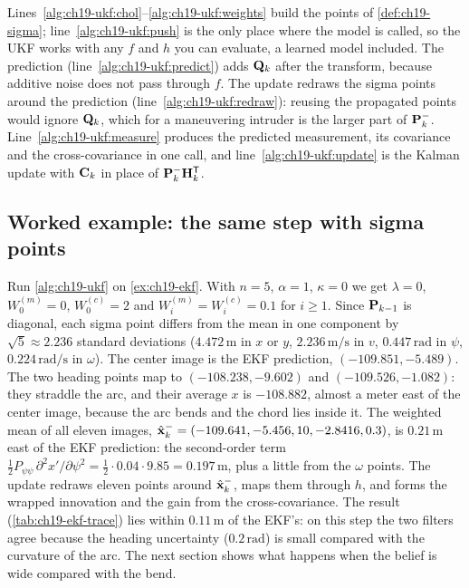 Lines~\ref{alg:ch19-ukf:chol}--\ref{alg:ch19-ukf:weights} build the points
of \cref{def:ch19-sigma}; line~\ref{alg:ch19-ukf:push} is the only place
where the model is called, so the UKF works with any $f$ and $h$ you can
evaluate, a learned model included. The prediction
(line~\ref{alg:ch19-ukf:predict}) adds $\mathbf{Q}_k$ after the transform,
because additive noise does not pass through $f$. The update redraws the
sigma points around the prediction (line~\ref{alg:ch19-ukf:redraw}):
reusing the propagated points would ignore $\mathbf{Q}_k$, which for a
maneuvering intruder is the larger part of $\mathbf{P}_k^-$.
Line~\ref{alg:ch19-ukf:measure} produces the predicted measurement, its
covariance and the cross-covariance in one call, and
line~\ref{alg:ch19-ukf:update} is the Kalman update with $\mathbf{C}_k$ in place
of $\mathbf{P}_k^-\mathbf{H}_k^{\mathsf{T}}$.

\subsection{Worked example: the same step with sigma points}
\label{sec:ch19-ukf-example}

Run \cref{alg:ch19-ukf} on \cref{ex:ch19-ekf}. With $n = 5$, $\alpha = 1$,
$\kappa = 0$ we get $\lambda = 0$, $W_0^{(m)} = 0$, $W_0^{(c)} = 2$ and
$W_i^{(m)} = W_i^{(c)} = 0.1$ for $i \ge 1$. Since $\mathbf{P}_{k-1}$ is
diagonal, each sigma point differs from the mean in one component by
$\sqrt{5} \approx 2.236$ standard deviations ($4.472\,\mathrm{m}$ in $x$ or
$y$, $2.236\,\mathrm{m/s}$ in $v$, $0.447\,\mathrm{rad}$ in $\psi$,
$0.224\,\mathrm{rad/s}$ in $\omega$). The center image is the EKF
prediction, $(-109.851, -5.489)$. The two heading points map to
$(-108.238, -9.602)$ and $(-109.526, -1.082)$: they straddle the arc, and
their average $x$ is $-108.882$, almost a meter east of the center image,
because the arc bends and the chord lies inside it. The weighted mean of
all eleven images, $\hat{\mathbf{x}}_k^- = (-109.641, -5.456, 10, -2.8416,
0.3)$, is $0.21\,\mathrm{m}$ east of the EKF prediction: the second-order
term $\tfrac12 P_{\psi\psi}\,\partial^2 x'/\partial\psi^2 = \tfrac12 \cdot
0.04 \cdot 9.85 = 0.197\,\mathrm{m}$, plus a little from the $\omega$
points. The update redraws eleven points around $\hat{\mathbf{x}}_k^-$, maps
them through $h$, and forms the wrapped innovation and the gain from the
cross-covariance. The result
(\cref{tab:ch19-ekf-trace}) lies within $0.11\,\mathrm{m}$ of the EKF's: on
this step the two filters agree because the heading uncertainty
($0.2\,\mathrm{rad}$) is small compared with the curvature of the arc. The
next section shows what happens when the belief is wide compared with the
bend.

